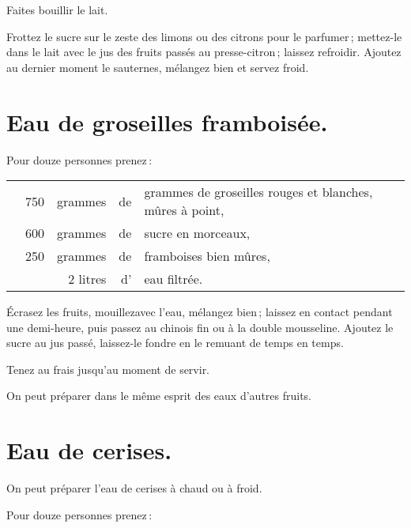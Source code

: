 Faites bouillir le lait.

Frottez le sucre sur le zeste des limons ou des citrons pour le parfumer ;
mettez-le dans le lait avec le jus des fruits passés au presse-citron ; laissez
refroidir. Ajoutez au dernier moment le sauternes, mélangez bien et servez
froid.

\section*{\centering Eau de groseilles framboisée.}
{}

Pour douze personnes prenez :

\footnotesize
\begin{longtable}{rrrrp{16em}}
  & 750 & grammes & de & grammes de groseilles rouges et blanches, mûres à point,                         \\
  & 600 & grammes & de & sucre en morceaux,                                                               \\
  & 250 & grammes & de & framboises bien mûres,                                                           \\
  & \multicolumn{2}{r}{2 litres} & d' & eau filtrée.                                                      \\
\end{longtable}
\normalsize

Écrasez les fruits, mouillezavec l'eau, mélangez bien ; laissez en contact
pendant une demi-heure, puis passez au chinois fin ou à la double mousseline.
Ajoutez le sucre au jus passé, laissez-le fondre en le remuant de temps en
temps.

Tenez au frais jusqu'au moment de servir.

\sk

On peut préparer dans le même esprit des eaux d'autres fruits.

\section*{\centering Eau de cerises.}
{}

On peut préparer l'eau de cerises à chaud ou à froid.

\medskip

Pour douze personnes prenez :

